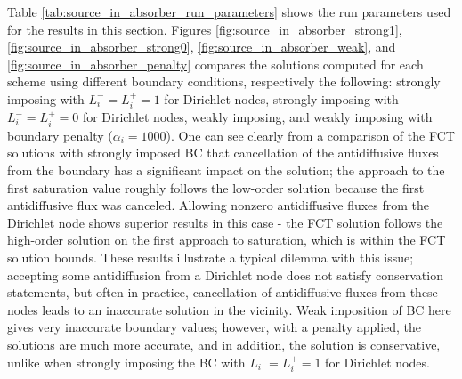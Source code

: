 Table \ref{tab:source_in_absorber_run_parameters} shows the run parameters used
for the results in this section.
Figures \ref{fig:source_in_absorber_strong1},
\ref{fig:source_in_absorber_strong0},
\ref{fig:source_in_absorber_weak}, and
\ref{fig:source_in_absorber_penalty}
compares the solutions computed for each scheme using different
boundary conditions, respectively the following:
strongly imposing with $L_i^-=L_i^+=1$ for Dirichlet nodes, 
strongly imposing with $L_i^-=L_i^+=0$ for Dirichlet nodes, 
weakly imposing, and
weakly imposing with boundary penalty ($\alpha_i = 1000$).
One can see clearly from a comparison of the FCT solutions with strongly
imposed BC that cancellation of the antidiffusive fluxes from the boundary
has a significant impact on the solution; the approach to the first saturation 
value roughly follows the low-order solution because the first antidiffusive
flux was canceled. Allowing nonzero antidiffusive fluxes from the Dirichlet
node shows superior results in this case - the FCT solution follows the
high-order solution on the
first approach to saturation, which is within the FCT solution bounds. These
results illustrate a typical dilemma with this issue; accepting some antidiffusion
from a Dirichlet node does not satisfy conservation statements, but often
in practice, cancellation of antidiffusive fluxes from these nodes leads to
an inaccurate solution in the vicinity.
Weak imposition of BC here gives very inaccurate boundary values;
however, with a penalty applied, the solutions are much more accurate,
and in addition, the solution is conservative, unlike when strongly imposing
the BC with $L_i^-=L_i^+=1$ for Dirichlet nodes.

